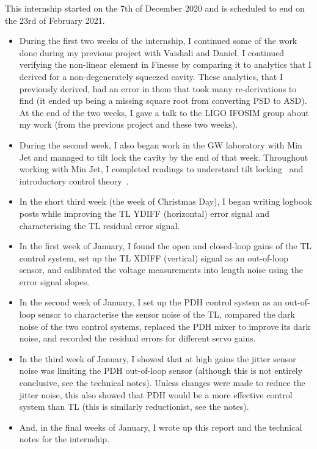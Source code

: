 \documentclass[aps,pra,superscriptaddress,reprint,nofootinbib]{revtex4-1}
\begin{document}
This internship started on the 7th of December 2020 and is scheduled to end on the 23rd of February 2021.

\begin{itemize}
\item During the first two weeks of the internship, I continued some of the work done during my previous project with Vaishali and Daniel. I continued verifying the non-linear element in Finesse by comparing it to analytics that I derived for a non-degenerately squeezed cavity. These analytics, that I previously derived, had an error in them that took many re-derivations to find (it ended up being a missing square root from converting PSD to ASD).
At the end of the two weeks, I gave a talk to the LIGO IFOSIM group about my work (from the previous project and these two weeks).
\item During the second week, I also began work in the GW laboratory with Min Jet and managed to tilt lock the cavity by the end of that week. Throughout working with Min Jet, I completed readings to understand tilt locking~\cite{TL:1999} and introductory control theory~\cite{Ward:2010,Bechhoefer:2005,FCS:2000}.
\item In the short third week (the week of Christmas Day), I began writing logbook posts while improving the TL YDIFF (horizontal) error signal and characterising the TL residual error signal.
\item In the first week of January, I found the open and closed-loop gains of the TL control system, set up the TL XDIFF (vertical) signal as an out-of-loop sensor, and calibrated the voltage measurements into length noise using the error signal slopes.
\item In the second week of January, I set up the PDH control system as an out-of-loop sensor to characterise the sensor noise of the TL, compared the dark noise of the two control systems, replaced the PDH mixer to improve its dark noise, and recorded the residual errors for different servo gains.
\item In the third week of January, I showed that at high gains the jitter sensor noise was limiting the PDH out-of-loop sensor (although this is not entirely conclusive, see the technical notes). Unless changes were made to reduce the jitter noise, this also showed that PDH would be a more effective control system than TL (this is similarly reductionist, see the notes).
\item And, in the final weeks of January, I wrote up this report and the technical notes for the internship.
\end{itemize}


\nocite{*}


\end{document}
